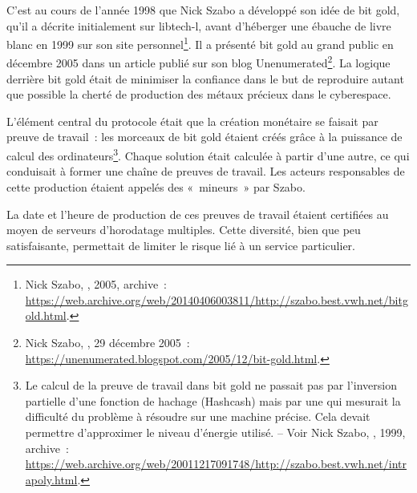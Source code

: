 C'est au cours de l'année 1998 que Nick Szabo a développé son idée de bit gold, qu'il a décrite initialement sur libtech-l, avant d'héberger une ébauche de livre blanc en 1999 sur son site personnel\footnote{Nick Szabo, , 2005, archive~: \url{https://web.archive.org/web/20140406003811/http://szabo.best.vwh.net/bitgold.html}.}. Il a présenté bit gold au grand public en décembre 2005 dans un article publié sur son blog Unenumerated\footnote{Nick Szabo, , 29 décembre 2005~: \url{https://unenumerated.blogspot.com/2005/12/bit-gold.html}.}. La logique derrière bit gold était de minimiser la confiance dans le but de reproduire autant que possible la cherté de production des métaux précieux dans le cyberespace.

L'élément central du protocole était que la création monétaire se faisait par preuve de travail~: les morceaux de bit gold étaient créés grâce à la puissance de calcul des ordinateurs\footnote{Le calcul de la preuve de travail dans bit gold ne passait pas par l'inversion partielle d'une fonction de hachage (Hashcash) mais par une  qui mesurait la difficulté du problème à résoudre sur une machine précise. Cela devait permettre d'approximer le niveau d'énergie utilisé. -- Voir Nick Szabo, , 1999, archive~: \url{https://web.archive.org/web/20011217091748/http://szabo.best.vwh.net/intrapoly.html}.}. Chaque solution était calculée à partir d'une autre, ce qui conduisait à former une chaîne de preuves de travail. Les acteurs responsables de cette production étaient appelés des «~mineurs~» par Szabo.


La date et l'heure de production de ces preuves de travail étaient certifiées au moyen de serveurs d'horodatage multiples. Cette diversité, bien que peu satisfaisante, permettait de limiter le risque lié à un service particulier.

